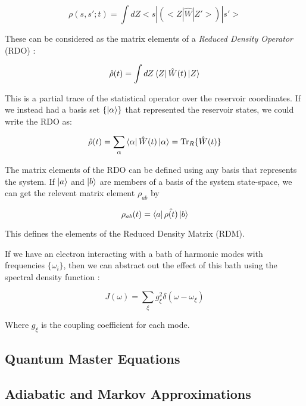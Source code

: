 \begin{equation}
\rho(s, s' ; t) = \int dZ <s|(<Z|\hat{W}|Z'>)|s'>
\end{equation}

These can be considered as the matrix elements of a \emph{Reduced Density Operator} (RDO) :

\begin{equation}
    \hat{\rho}(t) = \int dZ \bra{Z}\hat{W}(t)\ket{Z} 
\end{equation}

This is a partial trace of the statistical operator over the reservoir coordinates. If we instead had a basis set $\{\ket{\alpha}\}$ that represented the reservoir states, we could write the RDO as:

\begin{equation}
    \hat{\rho}(t) = \sum_{\alpha} \bra{\alpha}\hat{W}(t)\ket{\alpha} = \Tr_{R}\{\hat{W}(t)\}
\end{equation}

The matrix elements of the RDO can be defined using any basis that represents the system. If $\ket{a}$ and $\ket{b}$ are members of a basis of the system state-space, we can get the relevent matrix element $\rho_{ab}$ by

\begin{equation}
    \rho_{ab}(t) = \bra{a}\hat{\rho(t)}\ket{b}
\end{equation}

This defines the elements of the Reduced Density Matrix (RDM).

If we have an electron interacting with a bath of harmonic modes with frequencies $\{\omega_i\}$, then we can abstract out the effect of this bath using the spectral density function \cite{maykuhn}:

\begin{equation}
    J(\omega) = \sum_{\xi} g_{\xi}^2 \delta(\omega - \omega_{\xi})
\end{equation}

Where $g_{\xi}$ is the coupling coefficient for each mode. 

\subsection{Quantum Master Equations}

\subsection{Adiabatic and Markov Approximations}

